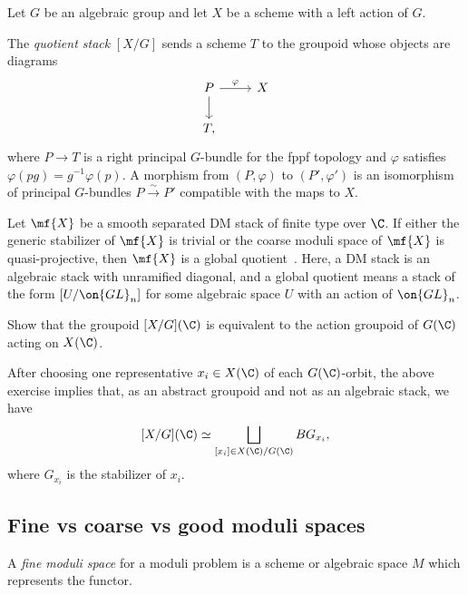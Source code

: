 Let \(G\) be an algebraic group and let \(X\) be a scheme with a left action of \(G\).

\begin{defn}
    The \textit{quotient stack} \([X/G]\) sends a scheme \(T\) to the groupoid whose objects are diagrams
    \begin{equation*}
    \begin{tikzcd}
        P \ar{r}{\varphi} \ar{d} & X \\
        T,
    \end{tikzcd}
    \end{equation*}
    where \(P\to T\) is a right principal \(G\)-bundle for the fppf topology and \(\varphi\) satisfies \(\varphi(pg)=g^{-1}\varphi(p)\). A morphism from \((P,\varphi)\) to \((P',\varphi')\) is an isomorphism of principal \(G\)-bundles \(P\xrightarrow{\sim}P'\) compatible with the maps to \(X\).
\end{defn}

\begin{exm}
    Let \(\mf{X}\) be a smooth separated DM stack of finite type over \(\C\). If either the generic stabilizer of \(\mf{X}\) is trivial or the coarse moduli space of \(\mf{X}\) is quasi-projective, then \(\mf{X}\) is a global quotient~\cite{EHKV2001}. Here, a DM stack is an algebraic stack with unramified diagonal, and a global quotient means a stack of the form \([U/\on{GL}_n]\) for some algebraic space \(U\) with an action of \(\on{GL}_n\).
\end{exm}

\begin{exer}
    Show that the groupoid \([X/G](\C)\) is equivalent to the action groupoid of \(G(\C)\) acting on \(X(\C)\).
\end{exer}

After choosing one representative \(x_i\in X(\C)\) of each \(G(\C)\)-orbit, the above exercise implies that, as an abstract groupoid and not as an algebraic stack, we have
\[ 
    [X/G](\C) \simeq \bigsqcup_{[x_i] \in X(\C)/G(\C)} BG_{x_i}, 
\]
where \(G_{x_i}\) is the stabilizer of \(x_i\).


\subsection{Fine vs coarse vs good moduli spaces}%
\label{sub:Fine vs coarse vs good moduli spaces}

\begin{defn}
    A \textit{fine moduli space} for a moduli problem is a scheme or algebraic space \(M\) which represents the functor. 
\end{defn}

